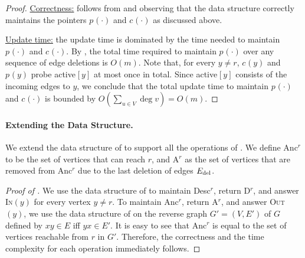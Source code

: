 \documentclass[11pt]{article}
\renewcommand{\textsc}[1]{\textnormal{\scshape #1}}
\newcommand{\desc}[1]{\textrm{{\normalfont Desc}\( ^{ #1 }\)}\xspace}
\newcommand{\D}[1]{\textrm{{\normalfont D}\(^{ #1 } \)}\xspace}
\newcommand{\anc}[1]{\textrm{{\normalfont Anc}\( ^{ #1 }\)}\xspace}
\newcommand{\A}[1]{\textrm{{\normalfont A}\( ^{ #1 } \)}\xspace}
\newcommand{\activee}[2]{\textrm{\normalfont active\( ^{  } [ #1 ] \)}\xspace} \newcommand{\inn}[2]{\textrm{\normalfont in\( ^{ } [ #1 ] \)}\xspace}
\newcommand{\edge}[2]{\ensuremath{ #1 #2 }\xspace}
\newcommand{\cc}[2]{\ensuremath{ c^{} (#1) }}
\newcommand{\parent}[2]{\ensuremath{ p^{} (#1) }}
\begin{document}
\begin{proof}

\underline{Correctness:}
follows from \cite{Italiano:1988aa} and observing that the data structure correctly maintains the pointers \parent{\cdot}{r} and \cc{\cdot}{r} as discussed above.

\underline{Update time:}
the update time is dominated by the time needed to maintain \parent{\cdot}{r} and \cc{\cdot}{r}.
By \cite{Italiano:1988aa}, the total time required to maintain \parent{\cdot}{r} over any sequence of edge deletions is \( O(m) \).
Note that, for every \( y \neq r \), \cc{y}{r} and \parent{y}{r} probe \activee{y}{r} at most once in total.
Since \activee{y}{r} consists of the incoming edges to \( y \), we conclude that the total update time to maintain \parent{\cdot}{r} and \cc{\cdot}{r} is bounded by \( O\left( \sum _{u \in V} \deg{v} \right) = O(m) \).
\end{proof}









\paragraph*{Extending the Data Structure.}
We extend the data structure of  to support all the operations of .
We define \anc{r} to be the set of vertices that can reach \( r \), and \A{r} as the set of vertices that are removed from \anc{r} due to the last deletion of edges \( \Ed \).


\begin{proof}[Proof of ]
We use the data structure of  to maintain \desc{r}, return \D{r}, and answer \textsc{In\( (y) \)} for every vertex \( y \neq r \).
To maintain \anc{r}, return \A{r}, and answer \textsc{Out\( (y) \)}, we use the data structure of  on the reverse graph \( G' = (V, E') \) of \( G \) defined by \( \edge{x}{y} \in E \) iff \( \edge{y}{x} \in E' \).
It is easy to see that \anc{r} is equal to the set of vertices reachable from \( r \) in \( G' \).
Therefore, the correctness and the time complexity for each operation immediately follows.
\end{proof}
\end{document}
